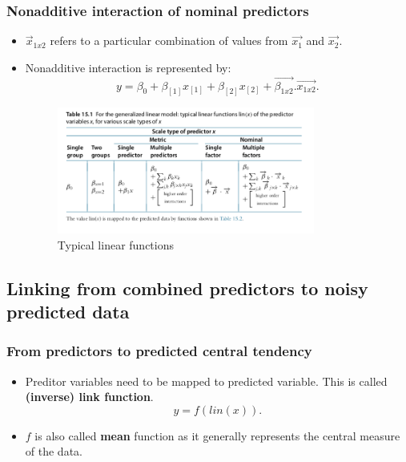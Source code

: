 \documentclass[a4paper]{article}
\begin{document}
\subsubsection{Nonadditive interaction of nominal predictors}
\begin{itemize}
    \item $\vec{x}_{1x2}$ refers to a particular combination of values from $\vec{x_1}$ and $\vec{x_2}$.
    \item Nonadditive interaction is represented by:
        \[
            y = \beta_0 + \beta_{[1]}x_{[1]} + \beta_{[2]}x_{[2]} + \vec{\beta_{1x2}} . \vec{x_{1x2}} 
        .\] 
        \begin{figure}[H]
            \centering
            \includegraphics[width=0.8\textwidth]{linear_functions}
            \caption{Typical linear functions}
            \label{fig:linear_functions}
        \end{figure}
\end{itemize}
\subsection{Linking from combined predictors to noisy predicted data}
\subsubsection{From predictors to predicted central tendency}
\begin{itemize}
    \item Preditor variables need to be mapped to predicted variable. This is called \textbf{(inverse) link function}.
        \[
            y = f(lin(x))
        .\] 
    \item $f$ is also called \textbf{mean} function as it generally represents the central measure of the data. 
\end{itemize}
\end{document}
